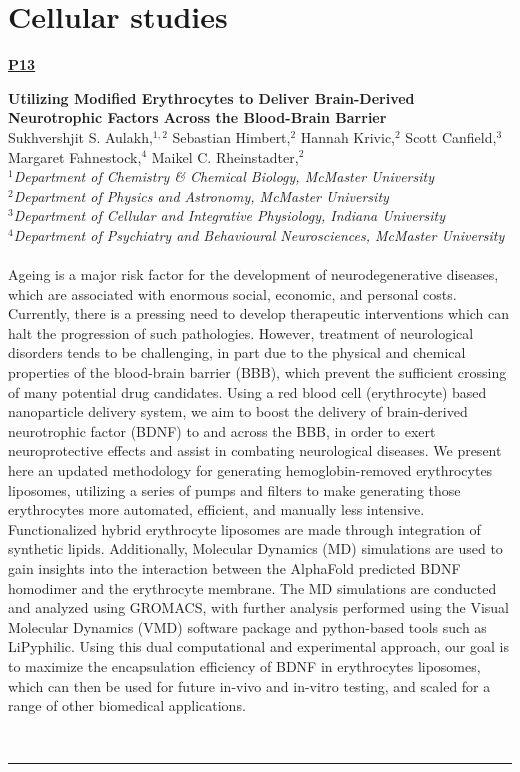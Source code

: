 \documentclass[titlepage,oneside,openany,10pt]{book}
\newenvironment{posterabs}[4] %
        {
	\begin{flushright}
                \underline{\textbf{#4}}
        \end{flushright}
        \textbf{#1}\\%
        #2\\%
        \textit{#3}\\\\%
        }
        {
        \\
        \noindent\rule{15cm}{0.5pt}%
        }
\begin{document}
\section*{Cellular studies}
\label{sec:cell}


\begin{posterabs}
	{Utilizing Modified Erythrocytes to Deliver Brain-Derived Neurotrophic Factors Across the Blood-Brain Barrier}
	{Sukhvershjit S. Aulakh,$^{1,2}$ Sebastian Himbert,$^{2}$ Hannah Krivic,$^{2}$ Scott Canfield,$^{3}$ Margaret Fahnestock,$^{4}$ Maikel C. Rheinstadter,$^{2}$}
	{
	$^1$Department of Chemistry \& Chemical Biology, McMaster University\\
	$^2$Department of Physics and Astronomy, McMaster University\\
	$^3$Department of Cellular and Integrative Physiology, Indiana University\\
	$^4$Department of Psychiatry and Behavioural Neurosciences, McMaster University
	}
	{P13}
	Ageing is a major risk factor for the development of neurodegenerative diseases, which are associated with enormous social, economic, and personal costs. Currently, there is a pressing need to develop therapeutic interventions which can halt the progression of such pathologies. However, treatment of neurological disorders tends to be challenging, in part due to the physical and chemical properties of the blood-brain barrier (BBB), which prevent the sufficient crossing of many potential drug candidates. Using a red blood cell (erythrocyte) based nanoparticle delivery system, we aim to boost the delivery of brain-derived neurotrophic factor (BDNF) to and across the BBB, in order to exert neuroprotective effects and assist in combating neurological diseases. We present here an updated methodology for generating hemoglobin-removed erythrocytes liposomes, utilizing a series of pumps and filters to make generating those erythrocytes more automated, efficient, and manually less intensive. Functionalized hybrid erythrocyte liposomes are made through integration of synthetic lipids. Additionally, Molecular Dynamics (MD) simulations are used to gain insights into the interaction between the AlphaFold predicted BDNF homodimer and the erythrocyte membrane. The MD simulations are conducted and analyzed using GROMACS, with further analysis performed using the Visual Molecular Dynamics (VMD) software package and python-based tools such as LiPyphilic. Using this dual computational and experimental approach, our goal is to maximize the encapsulation efficiency of BDNF in erythrocytes liposomes, which can then be used for future in-vivo and in-vitro testing, and scaled for a range of other biomedical applications.
	\label{AulakhS}
\end{posterabs}
\end{document}
